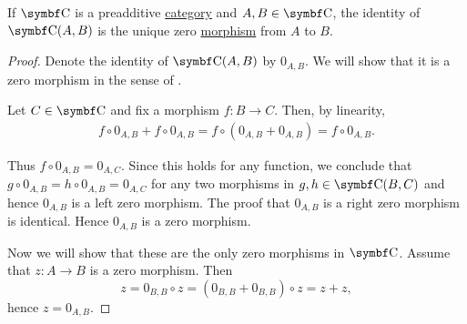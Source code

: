 \begin{proposition}\label{def:preadditive_zero_morphisms}
  If \( \Cat{C} \) is a preadditive \hyperref[def:preadditive_category]{category} and \( A, B \in \Cat{C} \), the identity of \( \Cat{C}(A, B) \) is the unique zero \hyperref[def:zero_morphism]{morphism} from \( A \) to \( B \).
\end{proposition}
\begin{proof}
  Denote the identity of \( \Cat{C}(A, B) \) by \( 0_{A,B} \). We will show that it is a zero morphism in the sense of .

  Let \( C \in \Cat{C} \) and fix a morphism \( f: B \to C \). Then, by linearity,
  \begin{align*}
    f \circ 0_{A,B} + f \circ 0_{A,B}
    =
    f \circ (0_{A,B} + 0_{A,B})
    =
    f \circ 0_{A,B}.
  \end{align*}

  Thus \( f \circ 0_{A,B} = 0_{A,C} \). Since this holds for any function, we conclude that \( g \circ 0_{A,B} = h \circ 0_{A,B} = 0_{A,C} \) for any two morphisms in \( g, h \in \Cat{C}(B,C) \) and hence \( 0_{A,B} \) is a left zero morphism. The proof that \( 0_{A,B} \) is a right zero morphism is identical. Hence \( 0_{A,B} \) is a zero morphism.

  Now we will show that these are the only zero morphisms in \( \Cat{C} \). Assume that \( z: A \to B \) is a zero morphism. Then
  \begin{equation*}
    z = 0_{B,B} \circ z = (0_{B,B} + 0_{B,B}) \circ z = z + z,
  \end{equation*}
  hence \( z = 0_{A,B} \).
\end{proof}

